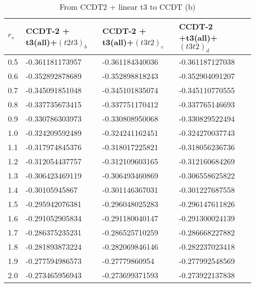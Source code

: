 \begin{table}[h]
\caption{From CCDT2 + linear t3 to CCDT (b)}
\begin{center}
\begin{threeparttable}
\begin{tabular}{l l l l}
    \toprule
$r_s$ & CCDT-2 + t3(all)+$(t2t3)_b$ & CCDT-2 + t3(all)+$(t3t2)_c$ & CCDT-2 +t3(all)+$(t3t2)_d$  \\ \hline
0.5 & -0.361181173957 & -0.361184340036 & -0.361187127038   \\
0.6 & -0.352892878689 & -0.352898818243 & -0.352904091207   \\
0.7 & -0.345091851048 & -0.345101835074 & -0.345110770555   \\
0.8 & -0.337735673415 & -0.337751170412 & -0.337765146693   \\
0.9 & -0.330786303973 & -0.330808950068 & -0.330829522494   \\
1.0 & -0.324209592489 & -0.324241162451 & -0.324270037743   \\
1.1 & -0.317974845376 & -0.318017225821 & -0.318056236736   \\
1.2 & -0.312054437757 & -0.312109603165 & -0.312160684269   \\
1.3 & -0.306423469119 & -0.306493460869 & -0.306558625822   \\
1.4 & -0.30105945867 & -0.301146367031 & -0.301227687558   \\
1.5 & -0.295942076381 & -0.296048025283 & -0.296147611826   \\
1.6 & -0.291052905834 & -0.291180040147 & -0.291300024139   \\
1.7 & -0.286375235231 & -0.286525710259 & -0.286668227882   \\
1.8 & -0.281893873224 & -0.282069846146 & -0.282237023418   \\
1.9 & -0.277594986573 & -0.27779860954 & -0.277992548569   \\
2.0 & -0.273465956943 & -0.273699371593 & -0.273922137838   \\
\bottomrule
\end{tabular}
\begin{tablenotes}
\end{tablenotes}
\end{threeparttable}
\end{center}
\label{tab:ccdt3_to_ccdt_2}
\end{table}

